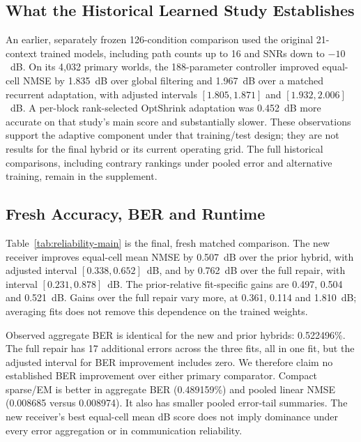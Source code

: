 \subsection{What the Historical Learned Study Establishes}
An earlier, separately frozen 126-condition comparison used the original 21-context trained models, including path counts up to 16 and SNRs down to $-10$~dB. On its 4,032 primary worlds, the 188-parameter controller improved equal-cell NMSE by 1.835~dB over global filtering and 1.967~dB over a matched recurrent adaptation, with adjusted intervals $[1.805,1.871]$ and $[1.932,2.006]$~dB. A per-block rank-selected OptShrink adaptation was 0.452~dB more accurate on that study's main score and substantially slower. These observations support the adaptive component under that training/test design; they are not results for the final hybrid or its current operating grid. The full historical comparisons, including contrary rankings under pooled error and alternative training, remain in the supplement.

\subsection{Fresh Accuracy, BER and Runtime}

Table~\ref{tab:reliability-main} is the final, fresh matched comparison. The new receiver improves equal-cell mean NMSE by 0.507~dB over the prior hybrid, with adjusted interval $[0.338,0.652]$~dB, and by 0.762~dB over the full repair, with interval $[0.231,0.878]$~dB. The prior-relative fit-specific gains are 0.497, 0.504 and 0.521~dB. Gains over the full repair vary more, at 0.361, 0.114 and 1.810~dB; averaging fits does not remove this dependence on the trained weights.

Observed aggregate BER is identical for the new and prior hybrids: 0.522496\%. The full repair has 17 additional errors across the three fits, all in one fit, but the adjusted interval for BER improvement includes zero. We therefore claim no established BER improvement over either primary comparator. Compact sparse/EM is better in aggregate BER (0.489159\%) and pooled linear NMSE (0.008685 versus 0.008974). It also has smaller pooled error-tail summaries. The new receiver's best equal-cell mean dB score does not imply dominance under every error aggregation or in communication reliability.

